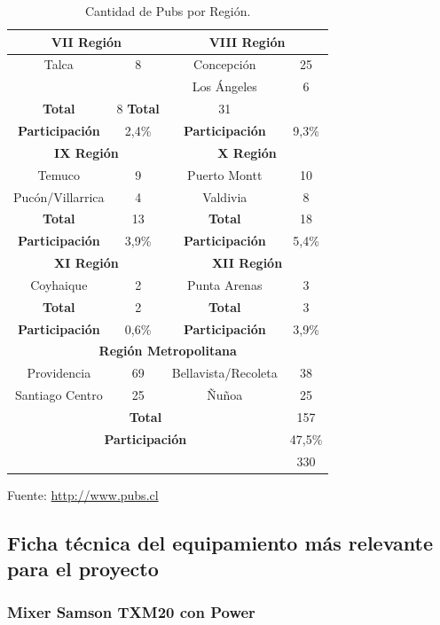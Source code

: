 \begin{table}[htb!]
{\begin{tabular}{|c|c|c|c|}
	\multicolumn{2}{|c|}{\textbf{VII Región}} &\multicolumn{2}{|c|}{\textbf{VIII Región}}\\
	\hline
		Talca			&8 	&Concepción			& 25 \\
					&	&Los Ángeles			& 6 \\
	\textbf{Total}			&8	\textbf{Total}			&31\\
	\textbf{Participación}		&2,4\% 	&\textbf{Participación}		&9,3\%\\
	\hline	
	\hline
	\multicolumn{2}{|c|}{\textbf{IX Región}}&\multicolumn{2}{|c|}{\textbf{X Región}}\\
	\hline
		Temuco			& 9 	&Puerto Montt			&10\\
		Pucón/Villarrica	& 4 	&Valdivia			&8\\
	\textbf{Total}			&13	&\textbf{Total}			&18\\
	\textbf{Participación}		&3,9\% &\textbf{Participación}		&5,4\%\\
	\hline
	\multicolumn{2}{|c|}{\textbf{XI Región}}&\multicolumn{2}{|c|}{\textbf{XII Región}}\\
	\hline
		Coyhaique		&2 	&Punta Arenas			&3\\
	\textbf{Total}			&2	&\textbf{Total}			&3\\
	\textbf{Participación}		&0,6\%	&\textbf{Participación}		&3,9\%\\
	\hline
	\multicolumn{4}{|c|}{\textbf{Región Metropolitana}}\\
	\hline
		Providencia 		& 69 &Bellavista/Recoleta	& 38\\
		Santiago Centro		& 25 &Ñuñoa			& 25\\
	\hline
	\multicolumn{3}{|c|}{\textbf{Total}} 			&157\\
	\hline
	\multicolumn{3}{|c|}{\textbf{Participación}}	&47,5\%\\
	\hline
	\multicolumn{3}{|c|}{\textbf{\blue{Total Pubs}}}	&330\\
	\hline
\end{tabular}}
\caption{Cantidad de Pubs por Región.}
\end{table}
	
Fuente: \url{http://www.pubs.cl}

\newpage
\subsection{Ficha técnica del equipamiento más relevante para el proyecto}

\subsubsection*{Mixer Samson TXM20 con Power}

